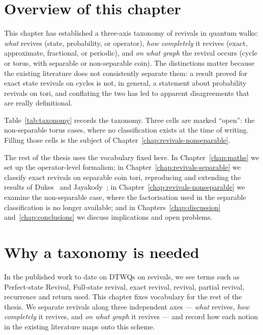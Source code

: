 
\section{Overview of this chapter}
This chapter has established a three-axis taxonomy of revivals in quantum
walks: \emph{what} revives (state, probability, or operator), \emph{how
completely} it revives (exact, approximate, fractional, or periodic), and
\emph{on what graph} the revival occurs (cycle or torus, with separable or
non-separable coin). The distinctions matter because the existing literature
does not consistently separate them: a result proved for exact state revivals
on cycles is not, in general, a statement about probability revivals on
tori, and conflating the two has led to apparent disagreements that are
really definitional.

Table~\ref{tab:taxonomy} records the taxonomy. Three cells are marked
``open'': the non-separable torus cases, where no classification exists at
the time of writing. Filling those cells is the subject of
Chapter~\ref{chap:revivals-nonseparable}.

The rest of the thesis uses the vocabulary fixed here. In
Chapter~\ref{chap:maths} we set up the operator-level formalism; in
Chapter~\ref{chap:revivals-separable} we classify exact revivals on
separable coin tori, reproducing and extending the results of
Dukes~\cite{Dukes2014} and Jayakody~\cite{Jayakody2018}; in
Chapter~\ref{chap:revivals-nonseparable} we examine the non-separable case,
where the factorisation used in the separable classification is no longer
available; and in Chapters~\ref{chap:discussion}
and~\ref{chap:conclusions} we discuss implications and open problems.

\section{Why a taxonomy is needed}
In the published work to date on DTWQs on revivals,  we see terms such as Perfect-state Revival, Full-state revival,
exact revival, revival, partial revival, recurrence and return used.
This chapter fixes
vocabulary for the rest of the thesis. We separate revivals along three
independent axes — \emph{what} revives, \emph{how completely} it revives,
and \emph{on what graph} it revives — and record how each notion in the
existing literature maps onto this scheme.

